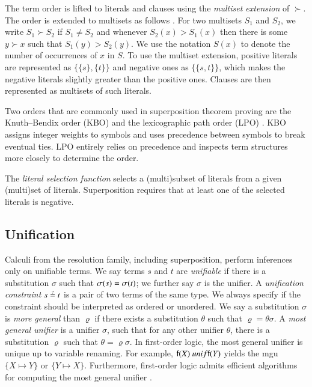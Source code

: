 The term order is lifted to literals and clauses using the {\em multiset extension} of
$\succ$. The order is extended to multisets as follows
\cite[Sect.~2.5]{bg-01-resolution}. For two multisets $S_1$ and $S_2$, we write $S_1 \succ S_2$ if $S_1 \not= S_2$
and whenever $S_2(x) > S_1(x)$ then there is some $y \succ x$ such that $S_1(y)
> S_2(y)$. We use the notation $S(x)$ to denote the number of occurrences of $x$ in
$S$. To use the  multiset extension, positive literals are represented as $ \{ \{s\},
\{t\} \}$ and negative ones as $\{ \{ s, t \} \}$, which makes the negative literals slightly greater than the positive ones.
Clauses are then represented as 
multisets of such literals. 

Two orders that are commonly used in superposition theorem proving are the
Knuth--Bendix order (KBO) \cite[Sect.~5.4.4]{bn-98-tr-and-all-that} and the
lexicographic path order (LPO) \cite[Sect.~5.4.2]{bn-98-tr-and-all-that}.
KBO assigns integer weights to symbols and uses precedence between symbols to
break eventual ties. LPO entirely relies on precedence and inspects term
structures more closely to determine the order. 

\newcommand{\selfun}{\ensuremath{\mathit{Sel}}}
The {\em literal selection function} selects a (multi)subset of literals
from a given (multi)set of literals. Superposition requires that at least one of the selected literals is negative.
\pagebreak[2] 

\subsection{Unification}
\label{sec:pre:unif}

Calculi from the resolution family, including superposition, perform inferences
only on unifiable terms. We say terms $s$ and $t$ are {\em unifiable} if there is a
substitution $\sigma$ such that $\sigma(s) = \sigma(t)$; we further say
$\sigma$ is the unifier. A \emph{unification constraint} $s \unif t$ is a pair of two terms of the same type. 
We always specify if the constraint should be interpreted as ordered or unordered.
We say a substitution $\sigma$ is \emph{more general} than $\varrho$ if there exists a substitution $\theta$
such that $\varrho = \theta\sigma$.
A \emph{most general unifier} is a
unifier $\sigma$, such that for any other unifier $\theta$, there is a
substitution $\varrho$ such that $\theta = \varrho\sigma$. In first-order logic,
the most general unifier is unique up to variable renaming. For example, $\mathsf{f}(X) \ unif \mathsf{f}(Y)$ yields the mgu 
$\{ X \mapsto Y\}$ or  $\{ Y \mapsto X \}$. Furthermore,
first-order logic admits efficient algorithms for computing the most general
unifier \cite{hv-09-unifalgs}.

